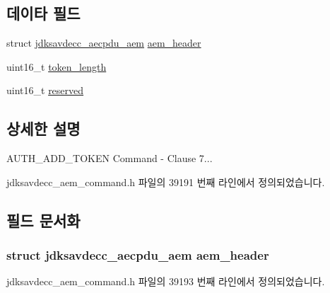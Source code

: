 \subsection*{데이타 필드}
\begin{DoxyCompactItemize}
\item 
struct \hyperlink{structjdksavdecc__aecpdu__aem}{jdksavdecc\+\_\+aecpdu\+\_\+aem} \hyperlink{structjdksavdecc__aem__command__auth__add__token_ae1e77ccb75ff5021ad923221eab38294}{aem\+\_\+header}
\item 
uint16\+\_\+t \hyperlink{structjdksavdecc__aem__command__auth__add__token_a97da4c134a2723b8dbcd1c88d8577991}{token\+\_\+length}
\item 
uint16\+\_\+t \hyperlink{structjdksavdecc__aem__command__auth__add__token_a5a6ed8c04a3db86066924b1a1bf4dad3}{reserved}
\end{DoxyCompactItemize}


\subsection{상세한 설명}
A\+U\+T\+H\+\_\+\+A\+D\+D\+\_\+\+T\+O\+K\+EN Command -\/ Clause 7... 

jdksavdecc\+\_\+aem\+\_\+command.\+h 파일의 39191 번째 라인에서 정의되었습니다.



\subsection{필드 문서화}
\subsubsection[{\texorpdfstring{aem\+\_\+header}{aem_header}}]{\setlength{\rightskip}{0pt plus 5cm}struct {\bf jdksavdecc\+\_\+aecpdu\+\_\+aem} aem\+\_\+header}\hypertarget{structjdksavdecc__aem__command__auth__add__token_ae1e77ccb75ff5021ad923221eab38294}{}\label{structjdksavdecc__aem__command__auth__add__token_ae1e77ccb75ff5021ad923221eab38294}


jdksavdecc\+\_\+aem\+\_\+command.\+h 파일의 39193 번째 라인에서 정의되었습니다.

